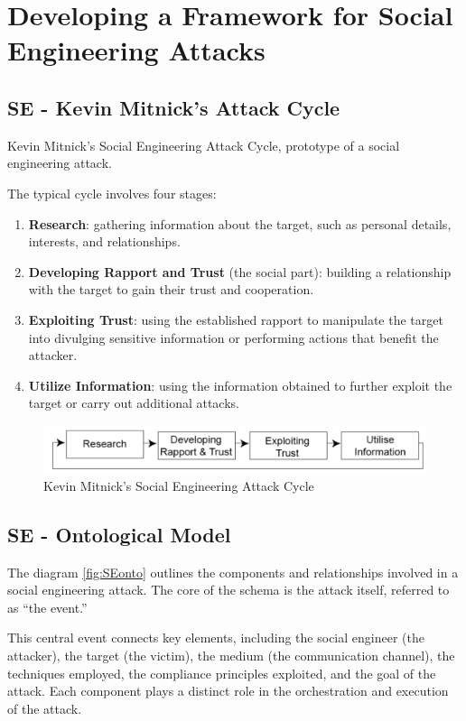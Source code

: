 \section{Developing a Framework for Social Engineering Attacks}
\subsection{SE - Kevin Mitnick's Attack Cycle}
\begin{center}
    Kevin Mitnick's Social Engineering Attack Cycle, prototype of a social engineering attack.
\end{center}
The typical cycle involves four stages:
\begin{enumerate}
    \item \textbf{Research}: gathering information about the target, such as personal details, interests, and relationships.
    \item \textbf{Developing Rapport and Trust} (the social part): building a relationship with the target to gain their trust and cooperation.
    \item \textbf{Exploiting Trust}: using the established rapport to manipulate the target into divulging sensitive information or performing actions that benefit the attacker.
    \item \textbf{Utilize Information}: using the information obtained to further exploit the target or carry out additional attacks.
\end{enumerate}


\begin{figure}[H]
    \centering
    \includegraphics[width=0.7\linewidth]{Images/Sociology/SEcycle.png}
    \caption{Kevin Mitnick's Social Engineering Attack Cycle}
\end{figure}

\subsection{SE - Ontological Model}
The diagram \ref{fig:SEonto} outlines the components and relationships involved in a social engineering attack. The core of the schema is the attack itself, referred to as “the event.”

This central event connects key elements, including the social engineer (the attacker), the target (the victim), the medium (the communication channel), the techniques employed, the compliance principles exploited, and the goal of the attack. Each component plays a distinct role in the orchestration and execution of the attack.

